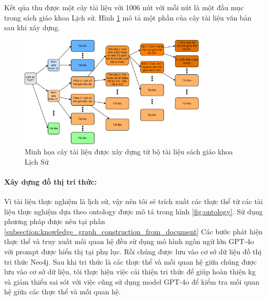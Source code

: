 Kết qủa thu được một cây tài liệu với 1006 nút với mỗi nút là một đầu mục trong sách giáo khoa Lịch sử. Hình \ref{fig:document_tree} mô tả một phần của cây tài liệu văn bản sau khi xây dựng.
\begin{figure}
    \centering
    \includegraphics[width=0.8\textwidth]{Chapter4/Fig/document_tree.png}
    \caption{Minh họa cây tài liệu được xây dựng từ bộ tài liệu sách giáo khoa Lịch Sử}
    \label{fig:document_tree}
\end{figure}
\paragraph{Xây dựng đồ thị tri thức:} Vì tài liệu thực nghiệm là lịch sử, vậy nên tôi sẽ trích xuất các thực thể từ các tài liệu thực nghiệm dựa theo ontology được mô tả trong hình \ref{fig:ontology}. Sử dụng phương pháp được nêu tại phần \ref{subsection:knowledge_graph_construction_from_document} Các bước phát hiện thực thể và truy xuất mối quan hệ đều sử dụng mô hình ngôn ngữ lớn GPT-4o với prompt được hiển thị tại phụ lục. Rồi chúng được lưu vào cơ sở dữ liệu đồ thị tri thức Neo4j. Sau khi tri thức là các thực thể và mối quan hệ giữa chúng được lưu vào cơ sở dữ liệu, tôi thực hiện việc cải thiện tri thức để giúp hoàn thiện \gls{kg} và giảm thiểu sai sót với việc cũng sử dụng model GPT-4o để kiểm tra mối quan hệ giữa các thực thể và mối quan hệ.


